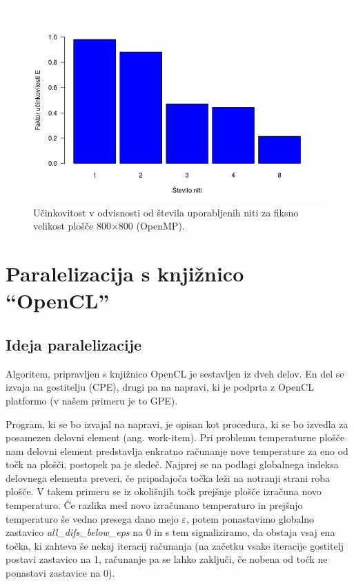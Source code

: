 \documentclass[a4paper,titlepage,11pt]{article}
\begin{document}
\begin{figure}[H]
\begin{center}
\includegraphics[scale=0.55]{graf-rezultati-3_3.png}
\caption{Učinkovitost v odvisnosti od števila uporabljenih niti za fiksno velikost plošče 800$\times$800 (OpenMP).}
\label{graf-rezultati-ucinkovitost-3}
\end{center}
\vspace{-25pt}
\end{figure}

\pagebreak

\section{Paralelizacija s knjižnico ``OpenCL''}
\label{poglavje-opencl}
\subsection{Ideja paralelizacije}

Algoritem, pripravljen s knjižnico OpenCL je sestavljen iz dveh delov. En del se izvaja na gostitelju (CPE), drugi pa na napravi, ki je podprta z OpenCL platformo (v našem primeru je to GPE).

Program, ki se bo izvajal na napravi, je opisan kot procedura, ki se bo izvedla za posamezen delovni element (ang. work-item). Pri problemu temperaturne plošče nam delovni element predstavlja enkratno računanje nove temperature za eno od točk na plošči, postopek pa je sledeč. Najprej se na podlagi globalnega indeksa delovnega elementa preveri, če pripadajoča točka leži na notranji strani roba plošče. V takem primeru se iz okolišnjih točk prejšnje plošče izračuna novo temperaturo. Če razlika med novo izračunano temperaturo in prejšnjo temperaturo še vedno presega dano mejo \(\varepsilon\), potem ponastavimo globalno zastavico \textit{all\_difs\_below\_eps} na 0 in s tem signaliziramo, da obstaja vsaj ena točka, ki zahteva še nekaj iteracij računanja (na začetku vsake iteracije gostitelj postavi zastavico na 1, računanje pa se lahko zaključi, če nobena od točk ne ponastavi zastavice na 0).
\end{document}
